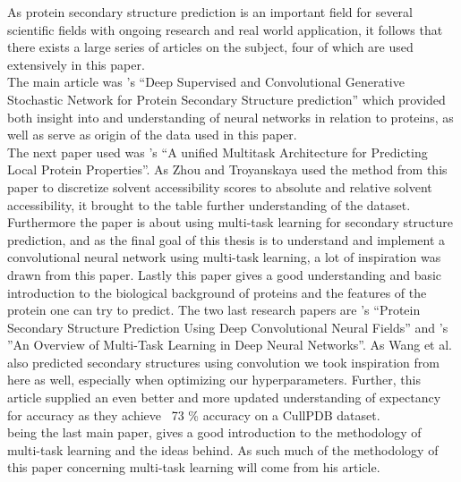 As protein secondary structure prediction is an important field for several scientific fields with ongoing research and real world application, it follows that there exists a large series of articles on the subject, four of which are used extensively in this paper. \\
The main article was \citeauthor{zhou-and-troyanskaya-2014}’s “Deep Supervised and Convolutional Generative Stochastic Network for Protein Secondary Structure prediction” which provided both insight into and understanding of neural networks in relation to proteins, as well as serve as origin of the data used in this paper. \\
The next paper used was \citeauthor{qi-et-al-2012}’s “A unified Multitask Architecture for Predicting Local Protein Properties”. As Zhou and Troyanskaya used the method from this paper to discretize solvent accessibility scores to absolute and relative solvent accessibility, it brought to the table further understanding of the dataset. Furthermore the paper is about using multi-task learning for secondary structure prediction, and as the final goal of this thesis is to understand and implement a convolutional neural network using multi-task learning, a lot of inspiration was drawn from this paper. Lastly this paper gives a good understanding and basic introduction to the biological background of proteins and the features of the protein one can try to predict. 
The two last research papers are \citeauthor{wang-et-al-2016}’s “Protein Secondary Structure Prediction Using Deep Convolutional Neural Fields” and \citeauthor{ruder-2017}’s ”An Overview of Multi-Task Learning in Deep Neural Networks”.  As Wang et al. also predicted secondary structures using convolution we took inspiration from here as well, especially when optimizing our hyperparameters. Further, this article supplied an even better and more updated understanding of expectancy for accuracy as they achieve ~73 \% accuracy on a CullPDB dataset. \\
\cite{ruder-2017} being the last main paper, gives a good introduction to the methodology of multi-task learning and the ideas behind. As such much of the methodology of this paper concerning multi-task learning will come from his article.










